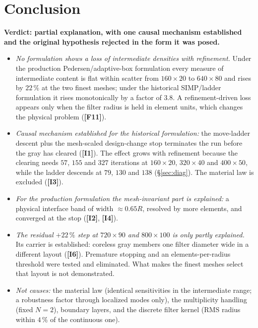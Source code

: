 \documentclass[10pt,a4paper]{article}
\newcommand{\fact}[1]{\textbf{[F#1]}}
\newcommand{\interp}[1]{\textbf{[I#1]}}
\begin{document}
\section*{Conclusion}

\noindent\textbf{Verdict: partial explanation, with one causal mechanism established and the original hypothesis rejected in the form it was posed.}
\begin{itemize}
\item \emph{No formulation shows a loss of intermediate densities with refinement.} Under the production Pedersen/adaptive-box formulation every measure of intermediate content is flat within scatter from $160\times20$ to $640\times80$ and rises by $22\,\%$ at the two finest meshes; under the historical SIMP/ladder formulation it rises monotonically by a factor of $3.8$. A refinement-driven loss appears only when the filter radius is held in element units, which changes the physical problem (\fact{11}).
\item \emph{Causal mechanism established for the historical formulation:} the move-ladder descent plus the mesh-scaled design-change stop terminates the run before the gray has cleared (\interp{1}). The effect grows with refinement because the clearing needs $57$, $155$ and $327$ iterations at $160\times20$, $320\times40$ and $400\times50$, while the ladder descends at $79$, $130$ and $138$ (\S\ref{sec:diag}). The material law is excluded (\interp{3}).
\item \emph{For the production formulation the mesh-invariant part is explained:} a physical interface band of width $\approx0.65R$, resolved by more elements, and converged at the stop (\interp{2}, \interp{4}).
\item \emph{The residual $+22\,\%$ step at $720\times90$ and $800\times100$ is only partly explained.} Its carrier is established: coreless gray members one filter diameter wide in a different layout (\interp{6}). Premature stopping and an elements-per-radius threshold were tested and eliminated. What makes the finest meshes select that layout is not demonstrated.
\item \emph{Not causes:} the material law (identical sensitivities in the intermediate range; a robustness factor through localized modes only), the multiplicity handling (fixed $N=2$), boundary layers, and the discrete filter kernel (RMS radius within $4\,\%$ of the continuous one).
\end{itemize}
\end{document}
